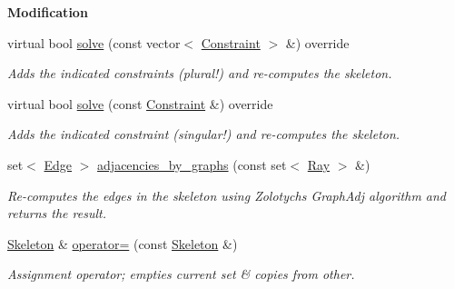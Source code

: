 \begin{Indent}\textbf{ Modification}\par
\begin{DoxyCompactItemize}
\item 
virtual bool \hyperlink{group___c_l_s_solvers_adf50f125e2bfc6834fdd93e3fff22c48}{solve} (const vector$<$ \hyperlink{group___c_l_s_solvers_class_l_p___solvers_1_1_constraint}{Constraint} $>$ \&) override
\begin{DoxyCompactList}\small\item\em Adds the indicated constraints (plural!) and re-\/computes the skeleton. \end{DoxyCompactList}\item 
virtual bool \hyperlink{group___c_l_s_solvers_a3b0e821ab6a683ab4f936b7552074a15}{solve} (const \hyperlink{group___c_l_s_solvers_class_l_p___solvers_1_1_constraint}{Constraint} \&) override
\begin{DoxyCompactList}\small\item\em Adds the indicated constraint (singular!) and re-\/computes the skeleton. \end{DoxyCompactList}\item 
\mbox{\label{group___c_l_s_solvers_a91e67ca8a8fc7a891534462c21051ea1}} 
set$<$ \hyperlink{group___c_l_s_solvers_class_l_p___solvers_1_1_edge}{Edge} $>$ \hyperlink{group___c_l_s_solvers_a91e67ca8a8fc7a891534462c21051ea1}{adjacencies\+\_\+by\+\_\+graphs} (const set$<$ \hyperlink{group___c_l_s_solvers_class_l_p___solvers_1_1_ray}{Ray} $>$ \&)
\begin{DoxyCompactList}\small\item\em Re-\/computes the edges in the skeleton using Zolotych\textquotesingle{}s {\ttfamily Graph\+Adj} algorithm and returns the result. \end{DoxyCompactList}\item 
\mbox{\label{group___c_l_s_solvers_a6ca243248975b2f1935169d78c44033b}} 
\hyperlink{group___c_l_s_solvers_class_l_p___solvers_1_1_skeleton}{Skeleton} \& \hyperlink{group___c_l_s_solvers_a6ca243248975b2f1935169d78c44033b}{operator=} (const \hyperlink{group___c_l_s_solvers_class_l_p___solvers_1_1_skeleton}{Skeleton} \&)
\begin{DoxyCompactList}\small\item\em Assignment operator; empties current set \& copies from other. \end{DoxyCompactList}\end{DoxyCompactItemize}
\end{Indent}
